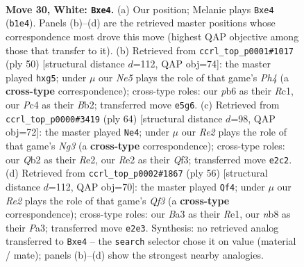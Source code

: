 \documentclass[11pt]{article}
\begin{document}
\clearpage

\begin{figure}[p]\centering
\begin{subfigure}{0.46\textwidth}\centering
\resizebox{\linewidth}{!}{%
\newchessgame
\chessboard[
  setfen={1nbqr1k1/5p2/1p1P1n2/r3N1pp/p1P1p3/B5PP/PQ2RP2/RB4K1 w - - 1 30},
  showmover=false,
  pgfstyle=straightmove, color=movearrow, markmove={b1-e4}
]}
\caption{}
\end{subfigure}\hfill
\begin{subfigure}{0.46\textwidth}\centering
\resizebox{\linewidth}{!}{%
\newchessgame
\chessboard[
  setfen={2rqr3/1p2nbbk/p2p4/3P1pp1/PP2p2P/1QN3P1/1B1R1PB1/2R3K1 w - - 0 26},
  showmover=false,
  pgfstyle=straightmove, color=movearrow, markmove={h4-g5}
]}
\caption{}
\end{subfigure}
\\[4pt]
\begin{subfigure}{0.46\textwidth}\centering
\resizebox{\linewidth}{!}{%
\newchessgame
\chessboard[
  setfen={2r1r1k1/3n1p2/1q1ppnpb/p6p/2PP1P2/P2B1QNP/4R1P1/3RB2K w - - 6 33},
  showmover=false,
  pgfstyle=straightmove, color=movearrow, markmove={g3-e4}
]}
\caption{}
\end{subfigure}\hfill
\begin{subfigure}{0.46\textwidth}\centering
\resizebox{\linewidth}{!}{%
\newchessgame
\chessboard[
  setfen={2br2k1/2q1rpp1/p4n1p/1p1pNP2/3P4/P1PBRQ1P/6PK/4R3 w - - 3 29},
  showmover=false,
  pgfstyle=straightmove, color=movearrow, markmove={f3-f4}
]}
\caption{}
\end{subfigure}
\caption{\textbf{Move 30, White: \texttt{Bxe4}.} (a) Our position; Melanie plays \texttt{Bxe4} (\texttt{b1e4}). Panels (b)--(d) are the retrieved master positions whose correspondence most drove this move (highest QAP objective among those that transfer to it). (b) Retrieved from \texttt{ccrl\_top\_p0001\#1017} (ply 50) [structural distance $d$=112, QAP obj=74]: the master played \texttt{hxg5}; under $\mu$ our \emph{Ne5} plays the role of that game's \emph{Ph4} (a \textbf{cross-type} correspondence); cross-type roles: our \emph{p}b6 as their \emph{R}c1, our \emph{P}c4 as their \emph{B}b2; transferred move \texttt{e5g6}. (c) Retrieved from \texttt{ccrl\_top\_p0000\#3419} (ply 64) [structural distance $d$=98, QAP obj=72]: the master played \texttt{Ne4}; under $\mu$ our \emph{Re2} plays the role of that game's \emph{Ng3} (a \textbf{cross-type} correspondence); cross-type roles: our \emph{Q}b2 as their \emph{R}e2, our \emph{R}e2 as their \emph{Q}f3; transferred move \texttt{e2c2}. (d) Retrieved from \texttt{ccrl\_top\_p0002\#1867} (ply 56) [structural distance $d$=112, QAP obj=70]: the master played \texttt{Qf4}; under $\mu$ our \emph{Re2} plays the role of that game's \emph{Qf3} (a \textbf{cross-type} correspondence); cross-type roles: our \emph{B}a3 as their \emph{R}e1, our \emph{n}b8 as their \emph{P}a3; transferred move \texttt{e2e3}. Synthesis: no retrieved analog transferred to \texttt{Bxe4} -- the \texttt{search} selector chose it on value (material / mate); panels (b)--(d) show the strongest nearby analogies.}
\label{fig:thought-m58}
\end{figure}
\end{document}
